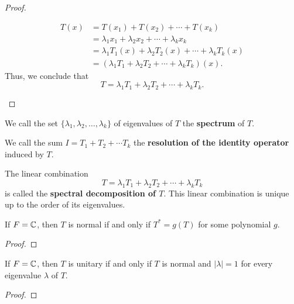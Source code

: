 \begin{proof}
\begin{enumerate}
\begin{align*}
            T(x) &= T({x}_{1}) + T({x}_{2}) + \cdots + T({x}_{k}) \\
                 &= {\lambda}_{1} {x}_{1} + {\lambda}_{2} {x}_{2} + \cdots + {\lambda}_{k} {x}_{k} \\ 
                 &= {\lambda}_{1} {T}_{1}(x) + {\lambda}_{2} {T}_{2}(x) + \cdots + {\lambda}_{k} {T}_{k}(x) \\
                 &=  ({\lambda}_{1} {T}_{1} + {\lambda}_{2} {T}_{2} + \cdots + {\lambda}_{k} {T}_{k } )(x).
        \end{align*}
        Thus, we conclude that 
        \[  T = {\lambda}_{1} {T}_{1} + {\lambda}_{2} {T}_{2} + \cdots + {\lambda}_{k} {T}_{k}. \]
     \end{enumerate}
\end{proof}

\begin{definition}[Spectrum of \(T\)]
    We call the set \( \{ {\lambda}_{1}, {\lambda}_{2}, \dots, {\lambda}_{k} \}  \) of eigenvalues of \( T  \) the \textbf{spectrum} of \( T  \).
\end{definition}

\begin{definition}
   We call the sum \( I = {T}_{1} + {T}_{2} + \cdots {T}_{k} \) the \textbf{resolution of the identity operator} induced by \( T  \). 
\end{definition}

\begin{definition}
    The linear combination 
    \[  T = {\lambda}_{1} {T}_{1} + {\lambda}_{2} {T}_{2} + \cdots + {\lambda}_{k} {T}_{k} \]
    is called the \textbf{spectral decomposition of \( T  \)}. This linear combination is unique up to the order of its eigenvalues.
\end{definition}

\begin{corollary}
    If \(F = \mathbb{C}  \), then \( T  \) is normal if and only if \( T^{*} = g(T) \) for some polynomial \( g  \).
\end{corollary}
\begin{proof}

\end{proof}

\begin{corollary}
    If \( F = \mathbb{C}  \), then \( T  \) is unitary if and only if \( T  \) is normal and \( | \lambda |  = 1  \) for every eigenvalue \( \lambda \) of \( T  \).
\end{corollary}
\begin{proof}

\end{proof}
